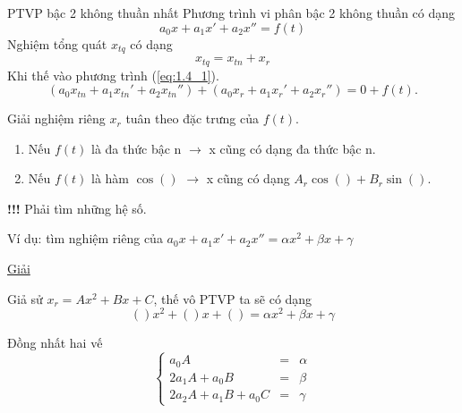 \begin{frame}{PTVP bậc 2 không thuần nhất}
    Phương trình vi phân bậc 2 không thuần có dạng
    \begin{equation}
        a_0 x + a_1 x' + a_2 x'' = f(t)
        \label{eq:1.4_1}
    \end{equation}
    Nghiệm tổng quát \(x_{tq}\) có dạng
    \begin{equation*}
        x_{tq} = x_{tn} + x_{r}
    \end{equation*}
    Khi thế vào phương trình (\ref{eq:1.4_1}).
    \begin{equation*}
        (a_0 x_{tn} + a_1 x_{tn}' + a_2 x_{tn}'') + (a_0 x_r + a_1 x_r' + a_2 x_r'') = 0 + f(t).
    \end{equation*}
\end{frame}
\begin{frame}{Giải nghiệm riêng}
    \(x_r\) tuân theo đặc trưng của \(f(t)\).
    \begin{enumerate}[\textbullet]
        \item Nếu \(f(t)\) là đa thức bậc n \(\rightarrow\) x cũng có dạng đa thức bậc n.
        \item Nếu \(f(t)\) là hàm \(\cos{()}\) \(\rightarrow\) x cũng có dạng \(A_r \cos{()} + B_r \sin{()}\).
    \end{enumerate}
    \textbf{!!!} Phải tìm những hệ số.
    \vspace{2mm}
    \pause

    Ví dụ: tìm nghiệm riêng của \(a_0 x + a_1 x' + a_2 x'' = \alpha x^2 + \beta x + \gamma\)
    \pause
    \vspace{2mm}

    \begin{center}
        \begin{minipage}{0.45\linewidth}
        \underline{Giải}
        \vspace{2mm}
        
            Giả sử \(x_r = A x^2 + B x + C\), thế vô PTVP ta sẽ có dạng
            \begin{equation*}
                ()x^2 + ()x + () = \alpha x^2 + \beta x + \gamma
            \end{equation*}
        \end{minipage}
        \hspace{3mm}
        \begin{minipage}{0.45\linewidth}
            Đồng nhất hai vế
            \begin{equation*}
            \left\{
                \begin{array}{lcl}
                a_0 A &=& \alpha \\
                2a_1 A + a_0 B &=& \beta \\
                2a_2 A + a_1 B + a_0 C &=& \gamma
                \end{array}
            \right.
            \end{equation*}
        \end{minipage}
    \end{center}
    
    
\end{frame}

